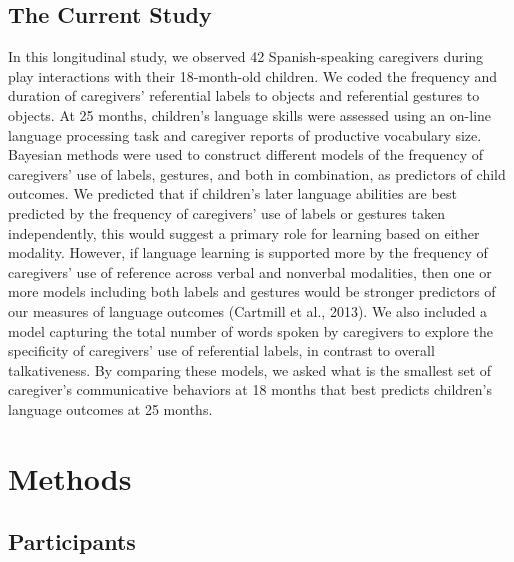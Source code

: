 \documentclass[
  english,
  man,floatsintext]{apa6}
\begin{document}
\hypertarget{the-current-study}{%
\subsection{The Current Study}\label{the-current-study}}

In this longitudinal study, we observed 42 Spanish-speaking caregivers during play interactions with their 18-month-old children. We coded the frequency and duration of caregivers' referential labels to objects and referential gestures to objects. At 25 months, children's language skills were assessed using an on-line language processing task and caregiver reports of productive vocabulary size. Bayesian methods were used to construct different models of the frequency of caregivers' use of labels, gestures, and both in combination, as predictors of child outcomes.
We predicted that if children's later language abilities are best predicted by the frequency of caregivers' use of labels or gestures taken independently, this would suggest a primary role for learning based on either modality. However, if language learning is supported more by the frequency of caregivers' use of reference across verbal and nonverbal modalities, then one or more models including both labels and gestures would be stronger predictors of our measures of language outcomes (Cartmill et al., 2013). We also included a model capturing the total number of words spoken by caregivers to explore the specificity of caregivers' use of referential labels, in contrast to overall talkativeness. By comparing these models, we asked what is the smallest set of caregiver's communicative behaviors at 18 months that best predicts children's language outcomes at 25 months.

\hypertarget{methods}{%
\section{Methods}\label{methods}}

\hypertarget{participants}{%
\subsection{Participants}\label{participants}}
\end{document}

